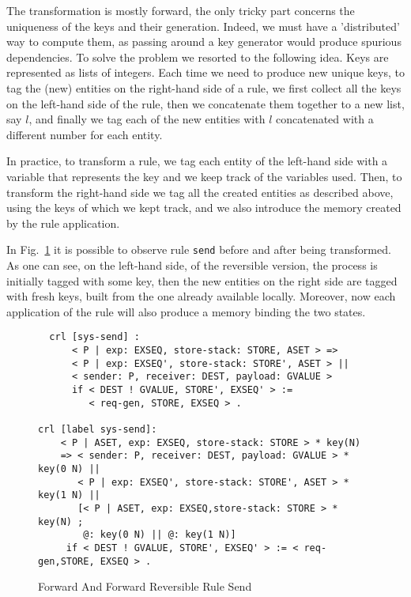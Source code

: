 \documentclass{article}[12pt,a4paper]
\theoremstyle{definition}
\begin{document}
The transformation is mostly forward, the only tricky part concerns the
uniqueness of the keys and their generation. Indeed, we must have a 'distributed' way to compute
them, as passing around a key generator would produce spurious dependencies. To
solve the problem we resorted to the following idea. Keys are represented as lists of
integers. Each time we need to produce new unique keys, to tag the (new) entities on
the right-hand side of a rule, we first collect all the keys on
the left-hand side of the rule, then we concatenate them together to a new list, say
$l$, and finally we tag
each of the new entities with $l$ concatenated with a different number for each
entity.

In practice, to transform a rule, we tag each entity of the left-hand
side with a variable that represents the key and we keep track of the variables
used. Then, to transform the right-hand side we tag all the created entities as
described above, using the keys of which we kept track, and we also introduce the memory created by the rule application.

In Fig.~\ref{fig:revsend} it is possible to observe rule \verb_send_ before and after being
transformed. As one can see, on the left-hand side, of the reversible version, the process is initially
tagged with some key, then the new entities on the right side are tagged with
fresh keys, built from the one already available locally. Moreover, now each
application of the rule will also produce a memory binding the two states.

\begin{figure}[t]
  \centering
\begin{verbatim}
  crl [sys-send] :
      < P | exp: EXSEQ, store-stack: STORE, ASET > =>
      < P | exp: EXSEQ', store-stack: STORE', ASET > ||
      < sender: P, receiver: DEST, payload: GVALUE >
      if < DEST ! GVALUE, STORE', EXSEQ' > :=
         < req-gen, STORE, EXSEQ > .

crl [label sys-send]:
    < P | ASET, exp: EXSEQ, store-stack: STORE > * key(N)
    => < sender: P, receiver: DEST, payload: GVALUE > * key(0 N) || 
       < P | exp: EXSEQ', store-stack: STORE', ASET > * key(1 N) || 
       [< P | ASET, exp: EXSEQ,store-stack: STORE > * key(N) ;
        @: key(0 N) || @: key(1 N)]
     if < DEST ! GVALUE, STORE', EXSEQ' > := < req-gen,STORE, EXSEQ > .
\end{verbatim}
  \caption{Forward And Forward Reversible Rule Send}
  \label{fig:revsend}
\end{figure}
\end{document}
